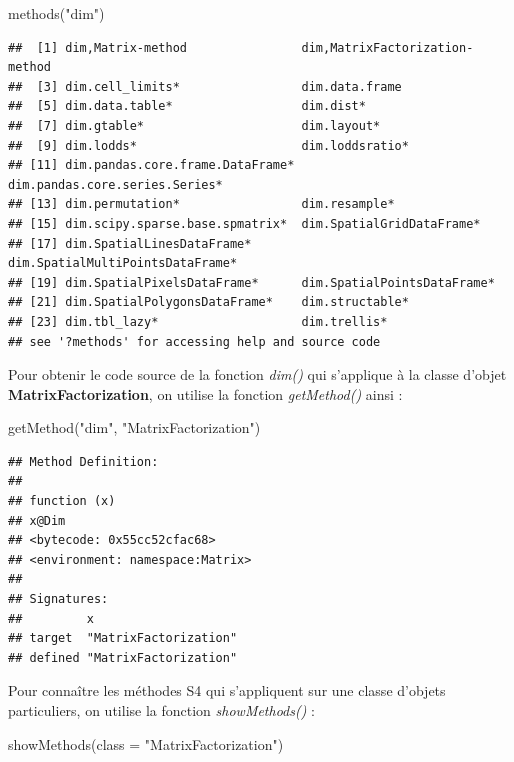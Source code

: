 \documentclass[
]{book}
\newenvironment{Shaded}{\begin{snugshade}}{\end{snugshade}}
\newcommand{\AttributeTok}[1]{\textcolor[rgb]{0.77,0.63,0.00}{#1}}
\newcommand{\FunctionTok}[1]{\textcolor[rgb]{0.00,0.00,0.00}{#1}}
\newcommand{\NormalTok}[1]{#1}
\newcommand{\StringTok}[1]{\textcolor[rgb]{0.31,0.60,0.02}{#1}}
\theoremstyle{definition}
\theoremstyle{definition}
\theoremstyle{definition}
\theoremstyle{definition}
\theoremstyle{remark}
\begin{document}
\begin{Shaded}
\begin{Highlighting}[]
\FunctionTok{methods}\NormalTok{(}\StringTok{"dim"}\NormalTok{)}
\end{Highlighting}
\end{Shaded}

\begin{verbatim}
##  [1] dim,Matrix-method                dim,MatrixFactorization-method  
##  [3] dim.cell_limits*                 dim.data.frame                  
##  [5] dim.data.table*                  dim.dist*                       
##  [7] dim.gtable*                      dim.layout*                     
##  [9] dim.lodds*                       dim.loddsratio*                 
## [11] dim.pandas.core.frame.DataFrame* dim.pandas.core.series.Series*  
## [13] dim.permutation*                 dim.resample*                   
## [15] dim.scipy.sparse.base.spmatrix*  dim.SpatialGridDataFrame*       
## [17] dim.SpatialLinesDataFrame*       dim.SpatialMultiPointsDataFrame*
## [19] dim.SpatialPixelsDataFrame*      dim.SpatialPointsDataFrame*     
## [21] dim.SpatialPolygonsDataFrame*    dim.structable*                 
## [23] dim.tbl_lazy*                    dim.trellis*                    
## see '?methods' for accessing help and source code
\end{verbatim}

Pour obtenir le code source de la fonction \emph{dim()} qui s'applique à la classe d'objet \textbf{MatrixFactorization}, on utilise la fonction \emph{getMethod()} ainsi :

\begin{Shaded}
\begin{Highlighting}[]
\FunctionTok{getMethod}\NormalTok{(}\StringTok{"dim"}\NormalTok{, }\StringTok{"MatrixFactorization"}\NormalTok{)}
\end{Highlighting}
\end{Shaded}

\begin{verbatim}
## Method Definition:
## 
## function (x) 
## x@Dim
## <bytecode: 0x55cc52cfac68>
## <environment: namespace:Matrix>
## 
## Signatures:
##         x                    
## target  "MatrixFactorization"
## defined "MatrixFactorization"
\end{verbatim}

Pour connaître les méthodes S4 qui s'appliquent sur une classe d'objets particuliers, on utilise la fonction \emph{showMethods()} :

\begin{Shaded}
\begin{Highlighting}[]
\FunctionTok{showMethods}\NormalTok{(}\AttributeTok{class =} \StringTok{"MatrixFactorization"}\NormalTok{)}
\end{Highlighting}
\end{Shaded}
\end{document}
